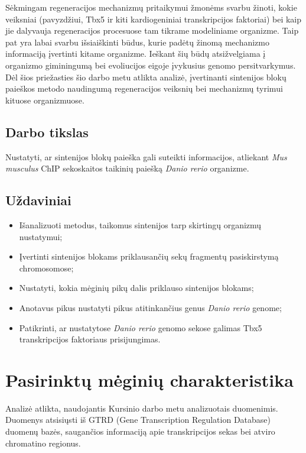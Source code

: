 \documentclass[12pt]{article}
\begin{document}
Sėkmingam regeneracijos mechanizmų pritaikymui žmonėms svarbu žinoti,
kokie veiksniai (pavyzdžiui, Tbx5 ir kiti kardiogeniniai transkripcijos
faktoriai) bei kaip jie dalyvauja regeneracijos procesuose tam tikrame
modeliniame organizme. Taip pat yra labai svarbu išsiaiškinti būdus,
kurie padėtų žinomą mechanizmo informaciją įvertinti kitame organizme.
Ieškant šių būdų atsižvelgiama į organizmo giminingumą bei evoliucijos
eigoje įvykusius genomo persitvarkymus. Dėl šios priežasties šio darbo metu
atlikta analizė, įvertinanti sintenijos blokų paieškos metodo naudingumą
regeneracijos veiksnių bei mechanizmų tyrimui kituose organizmuose.

\subsection*{Darbo tikslas}
Nustatyti, ar sintenijos blokų paieška gali suteikti informacijos, atliekant
\emph{Mus musculus} ChIP sekoskaitos taikinių paiešką \emph{Danio rerio}
organizme.

\subsection*{Uždaviniai}
\begin{itemize}
    \item Išanalizuoti metodus, taikomus sintenijos tarp skirtingų organizmų
          nustatymui;
    \item Įvertinti sintenijos blokams priklausančių sekų fragmentų
          pasiskirstymą chromosomose;
    \item Nustatyti, kokia mėginių pikų dalis priklauso sintenijos blokams;
    \item Anotavus pikus nustatyti pikus atitinkančius genus \emph{Danio rerio}
          genome;
    \item Patikrinti, ar nustatytose \emph{Danio rerio} genomo sekose galimas
          Tbx5 transkripcijos faktoriaus prisijungimas.
\end{itemize}

\newpage


\section{Pasirinktų mėginių charakteristika}
Analizė atlikta, naudojantis Kursinio darbo metu analizuotais duomenimis.
Duomenys atsisiųsti iš GTRD (Gene Transcription Regulation Database)\cite{GTRD}
duomenų bazės, saugančios informaciją apie transkripcijos sekas bei atviro
chromatino regionus.
\end{document}
